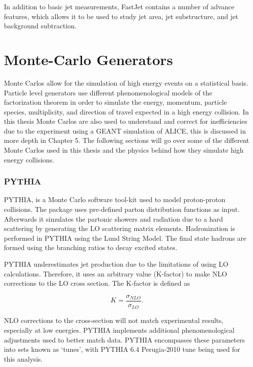 \noindent
In addition to basic jet measurements, FastJet contains a number of advance features, which allows it to be used to study jet area, jet substructure, and jet background subtraction\cite{Connors:2017ptx}.

\section{Monte-Carlo Generators}
Monte Carlos allow for the simulation of high energy events on a statistical basis.  Particle level generators use different phenomenological models of the factorization theorem in order to simulate the energy, momentum, particle species, multiplicity, and direction of travel expected in a high energy collision.  In this thesis Monte Carlos are also used to understand and correct for inefficiencies due to the experiment using a GEANT simulation of ALICE, this is discussed in more depth in Chapter 5.  The following sections will go over some of the different Monte Carlos used in this thesis and the physics behind how they simulate high energy collisions.

\subsubsection{PYTHIA}

PYTHIA\cite{Sjostrand:2007gs}, is a Monte Carlo software tool-kit used to model proton-proton collisions.  The package uses pre-defined parton distribution functions as input.  Afterwards it simulates the partonic showers and radiation due to a hard scattering by generating the LO scattering matrix elements.  Hadronization is performed in PYTHIA using the Lund String Model.  The final state hadrons are formed using the branching ratios to decay excited states.

PYTHIA underestimates jet production due to the limitations of using LO calculations.  Therefore, it uses an arbitrary value (K-factor) to make NLO corrections to the LO cross section.  The K-factor is defined as

\begin{equation}
K = \frac{\sigma_{NLO}}{\sigma_{LO}}.
\label{eq:Kfactor}
\end{equation}

NLO corrections to the cross-section will not match experimental results, especially at low energies.  PYTHIA implements additional phenomenological adjustments used to better match data.  PYTHIA encompasses these parameters into sets known as `tunes', with PYTHIA 6.4 Perugia-2010 tune being used for this analysis\cite{Skands:2010ak}.


